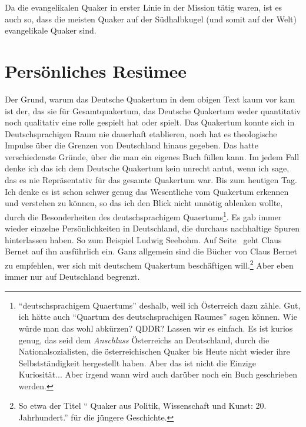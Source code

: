Da die evangelikalen Quaker in erster Linie in der Mission tätig waren, ist es
auch so, dass die meisten Quaker auf der Südhalbkugel (und somit auf der Welt)
evangelikale Quaker sind.

\section{Persönliches Resümee}

Der Grund, warum das Deutsche Quakertum in dem obigen Text kaum vor kam ist der,
das sie für Gesamtquakertum, das Deutsche Quakertum  weder quantitativ noch
qualitativ eine rolle gespielt hat oder spielt. Das Quakertum konnte sich in
Deutschsprachigen Raum nie dauerhaft etablieren, noch hat es theologische Impulse
über die Grenzen von Deutschland hinaus gegeben. Das hatte verschiedenste
Gründe, über die man ein eigenes Buch füllen kann.
Im jedem Fall denke ich das
ich dem Deutsche Quakertum kein unrecht antut, wenn ich sage, das es nie
Repräsentativ für das gesamte Quakertum war. Bis zum heutigen Tag. Ich denke es
ist schon schwer genug das Wesentliche vom Quakertum erkennen und verstehen zu
können, so das ich den Blick nicht unnötig ablenken wollte, durch die Besonderheiten des deutschsprachigem Quaertums\footnote{"`deutschsprachigem Quaertums"' deshalb,
weil ich Österreich dazu zähle. Gut, ich hätte auch "`Quartum des
deutschsprachigen Raumes"' sagen können. Wie würde man das wohl abkürzen? QDDR?
Lassen wir es einfach. Es ist kurios genug, das seid dem \textit{Anschluss}
Österreichs an Deutschland, durch die Nationalsozialisten, die österreichischen
Quaker bis Heute nicht wieder ihre Selbstständigkeit hergestellt haben. Aber das ist nicht die Einzige Kuriosität... Aber irgend wann wird auch darüber noch ein Buch geschrieben werden.}.
Es gab immer wieder einzelne
Persönlichkeiten in Deutschland, die durchaus nachhaltige Spuren hinterlassen haben. So
zum Beispiel Ludwig Seebohm. Auf Seite~\pageref{ref:l_seebohm} geht Claus Bernet
auf ihn ausführlich ein. Ganz allgemein sind die Bücher von Claus Bernet zu
empfehlen, wer sich mit deutschem Quakertum beschäftigen will.\footnote{So etwa der
Titel "`
Quaker aus Politik, Wissenschaft und Kunst: 20. Jahrhundert."' für die jüngere
Geschichte.} Aber eben immer nur auf Deutschland begrenzt.

\medskip


